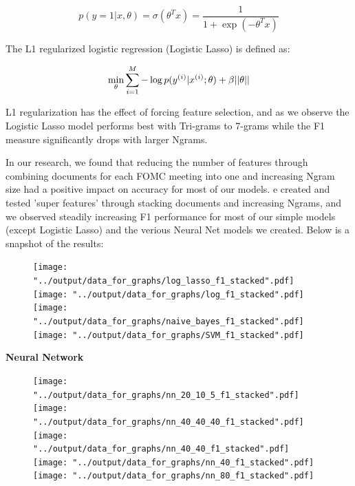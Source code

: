 \documentclass[11pt]{article}
\newcommand{\vertSpace}[1]{\vspace{3mm}}
\begin{document}
$$p(y=1|x,\theta) = \sigma(\theta^T x) = \frac{1}{1+\exp(-\theta^Tx)}$$

The L1 regularized logistic regression (Logistic Lasso) is defined as: 

$$\underset{\rm \theta}{\rm min} \sum_{i=1}^M -\log p(y^{(i)}|x^{(i)}; \theta) + \beta ||\theta||$$

L1 regularization has the effect of forcing feature selection, and as we observe the Logistic Lasso model performs best with Tri-grams to 7-grams while the F1 measure significantly drops with larger Ngrams.  \vertSpace 


\subsubsection{Stacked Documents}

In our research, we found that reducing the number of features through combining documents for each FOMC meeting into one and increasing Ngram size had a positive impact on accuracy for most of our models. \vertSpace


We created and tested 'super features' through stacking documents and increasing Ngrams, and we observed steadily increasing F1 performance for most of our simple models (except Logistic Lasso) and the verious Neural Net models we created.  Below is a snapshot of the results: 


\begin{figure}[H]
\begin{center}
\texttt{[image: "../output/data\_for\_graphs/log\_lasso\_f1\_stacked".pdf]}
\texttt{[image: "../output/data\_for\_graphs/log\_f1\_stacked".pdf]}
\texttt{[image: "../output/data\_for\_graphs/naive\_bayes\_f1\_stacked".pdf]}
\texttt{[image: "../output/data\_for\_graphs/SVM\_f1\_stacked".pdf]}
\end{center}
\end{figure}

\textbf{Neural Network}


\begin{figure}[H]
\begin{center}
\texttt{[image: "../output/data\_for\_graphs/nn\_20\_10\_5\_f1\_stacked".pdf]}
\texttt{[image: "../output/data\_for\_graphs/nn\_40\_40\_40\_f1\_stacked".pdf]}
\texttt{[image: "../output/data\_for\_graphs/nn\_40\_40\_f1\_stacked".pdf]}
\texttt{[image: "../output/data\_for\_graphs/nn\_40\_f1\_stacked".pdf]}
\texttt{[image: "../output/data\_for\_graphs/nn\_80\_f1\_stacked".pdf]}
\end{center}
\end{figure}
\end{document}
